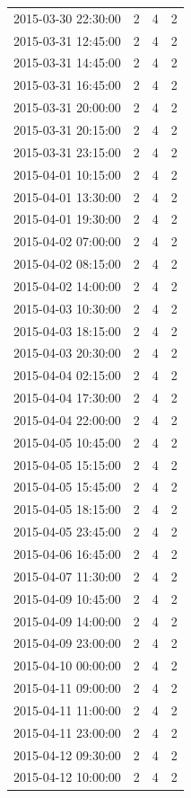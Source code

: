 \begin{tabular}{lrrr}
2015-03-30 22:30:00 & 2 & 4 & 2 \\
2015-03-31 12:45:00 & 2 & 4 & 2 \\
2015-03-31 14:45:00 & 2 & 4 & 2 \\
2015-03-31 16:45:00 & 2 & 4 & 2 \\
2015-03-31 20:00:00 & 2 & 4 & 2 \\
2015-03-31 20:15:00 & 2 & 4 & 2 \\
2015-03-31 23:15:00 & 2 & 4 & 2 \\
2015-04-01 10:15:00 & 2 & 4 & 2 \\
2015-04-01 13:30:00 & 2 & 4 & 2 \\
2015-04-01 19:30:00 & 2 & 4 & 2 \\
2015-04-02 07:00:00 & 2 & 4 & 2 \\
2015-04-02 08:15:00 & 2 & 4 & 2 \\
2015-04-02 14:00:00 & 2 & 4 & 2 \\
2015-04-03 10:30:00 & 2 & 4 & 2 \\
2015-04-03 18:15:00 & 2 & 4 & 2 \\
2015-04-03 20:30:00 & 2 & 4 & 2 \\
2015-04-04 02:15:00 & 2 & 4 & 2 \\
2015-04-04 17:30:00 & 2 & 4 & 2 \\
2015-04-04 22:00:00 & 2 & 4 & 2 \\
2015-04-05 10:45:00 & 2 & 4 & 2 \\
2015-04-05 15:15:00 & 2 & 4 & 2 \\
2015-04-05 15:45:00 & 2 & 4 & 2 \\
2015-04-05 18:15:00 & 2 & 4 & 2 \\
2015-04-05 23:45:00 & 2 & 4 & 2 \\
2015-04-06 16:45:00 & 2 & 4 & 2 \\
2015-04-07 11:30:00 & 2 & 4 & 2 \\
2015-04-09 10:45:00 & 2 & 4 & 2 \\
2015-04-09 14:00:00 & 2 & 4 & 2 \\
2015-04-09 23:00:00 & 2 & 4 & 2 \\
2015-04-10 00:00:00 & 2 & 4 & 2 \\
2015-04-11 09:00:00 & 2 & 4 & 2 \\
2015-04-11 11:00:00 & 2 & 4 & 2 \\
2015-04-11 23:00:00 & 2 & 4 & 2 \\
2015-04-12 09:30:00 & 2 & 4 & 2 \\
2015-04-12 10:00:00 & 2 & 4 & 2 \\

\end{tabular}
